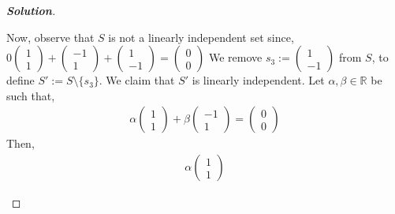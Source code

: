 \documentclass[10pt]{scrartcl}
\theoremstyle{definition}
\newenvironment{solution} {\begin{proof}[\normalfont \textbf{Solution}]} {\end{proof}}
\newcommand{\rn}{\mathbb{R}}
\begin{document}
\begin{solution}
\begin{enumerate}[label={(\roman*)}]
            Now, observe that $S$ is not a linearly independent set since, 
            $0
            \begin{pmatrix}
                1 \\ 
                1 
            \end{pmatrix}
            +
            \begin{pmatrix}
                -1 \\ 
                1
            \end{pmatrix}
            +
            \begin{pmatrix}
                1 \\ 
                -1
            \end{pmatrix}
            =
            \begin{pmatrix}
                0 \\ 
                0
            \end{pmatrix}
            $
            We remove $s_3 := 
            \begin{pmatrix}
                1 \\ 
                -1 
            \end{pmatrix}
            $ from $S$, to define $S' := S \setminus \{s_3\}$. We claim that $S'$ is
            linearly independent. Let $\alpha, \beta \in \rn$ be such that, 
            \begin{gather*}
                \alpha
                \begin{pmatrix}
                    1 \\ 
                    1 
                \end{pmatrix}
                + \beta
                \begin{pmatrix}
                    -1 \\ 
                    1 
                \end{pmatrix}
                =
                \begin{pmatrix}
                    0 \\ 
                    0 
                \end{pmatrix}
            \end{gather*}
            Then,
            \begin{gather*}
                \alpha
                \begin{pmatrix}
                    1 \\ 
                    1 
                \end{pmatrix}

\end{gather*}
\end{enumerate}
\end{solution}
\end{document}
